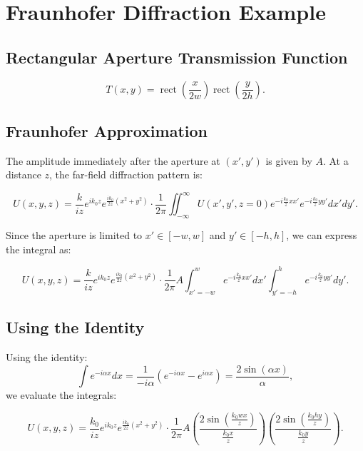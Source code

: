 \documentclass[11pt]{article}
\begin{document}
\section{Fraunhofer Diffraction Example}

\subsection{Rectangular Aperture Transmission Function}
\begin{equation}
    T(x,y) = \operatorname{rect} \left(\frac{x}{2w}\right) \operatorname{rect} \left(\frac{y}{2h}\right).
\end{equation}

\subsection{Fraunhofer Approximation}
The amplitude immediately after the aperture at \( (x',y') \) is given by \( A \). At a distance \( z \), the far-field diffraction pattern is:

\begin{equation}
    U(x,y,z) = \frac{k}{iz} e^{ik_0 z} e^{\frac{ik_0}{2z} (x^2 + y^2)}
    \cdot \frac{1}{2\pi} \iint_{-\infty}^{\infty} U(x', y', z=0) e^{-i \frac{k_0}{z} x x'} e^{-i \frac{k_0}{z} y y'} dx' dy'.
\end{equation}

Since the aperture is limited to \( x' \in [-w, w] \) and \( y' \in [-h, h] \), we can express the integral as:

\begin{equation}
    U(x,y,z) = \frac{k}{iz} e^{ik_0 z} e^{\frac{ik_0}{2z} (x^2 + y^2)}
    \cdot \frac{1}{2\pi} A \int_{x'=-w}^{w} e^{-i \frac{k_0}{z} x x'} dx'
    \int_{y'=-h}^{h} e^{-i \frac{k_0}{z} y y'} dy'.
\end{equation}

\subsection{Using the Identity}
Using the identity:
\begin{equation}
    \int e^{-i\alpha x} dx = \frac{1}{-i\alpha} \left( e^{-i\alpha x} - e^{i\alpha x} \right) = \frac{2\sin(\alpha x)}{\alpha},
\end{equation}
we evaluate the integrals:

\begin{equation}
    U(x,y,z) = \frac{k_0}{iz} e^{ik_0 z} e^{\frac{ik_0}{2z} (x^2+y^2)}
    \cdot \frac{1}{2\pi} A \left( \frac{2\sin\left(\frac{k_0 w x}{z}\right)}{\frac{k_0 x}{z}} \right)
    \left( \frac{2\sin\left(\frac{k_0 h y}{z}\right)}{\frac{k_0 y}{z}} \right).
\end{equation}
\end{document}
